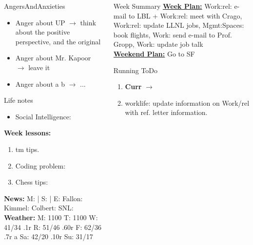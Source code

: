 \begin{columns}
\begin{column}{0.10\linewidth}
\begin{block}{AngersAndAnxieties}
\begin{itemize}
        \tiny \item \tiny Anger about UP $\rightarrow$ think about the positive
        perspective, and the original
      \item \tiny Anger about Mr. Kapoor $\rightarrow$  leave it
      \item \tiny Anger about a b  $\rightarrow$ ...
      \end{itemize}
    \end{block}
      \begin{block}{Life notes}
        \begin{itemize}
          \tiny \item \tiny Social Intelligence: 
        \end{itemize}
      \end{block}
      \begin{block}
        {\tiny {\bf Week lessons:}}
        \begin{enumerate}
        \item \tiny tm tips. 
        \item \tiny Coding problem:
        \item \tiny Chess tips: 
        \end{enumerate}
            {{\tiny {\tiny \bf  News:}} {\tiny  M:  | S: 
                | E: Fallon:  Kimmel:  Colbert: SNL:}}
            {{\tiny {\tiny \bf  Weather:}} {\tiny M: 1100 T: 1100 W: 41/34 .1r 
                 R: 51/46 .60r F: 62/36 .7r a Sa: 42/20 .10r Su: 31/17 }}
      \end{block}
  \end{column}
  \begin{column}{0.6\linewidth}
    \begin{block}{Week Summary}
      {\underline {\bf Week Plan:} 
        Work:rel: e-mail to LBL + Work:rel: meet with Crago, Work:rel: update LLNL jobs, Mgmt:Spaces: book flights, 
        Work: send e-mail to Prof. Gropp, Work: update job talk
      }\\

      {\underline{\bf Weekend Plan:} Go to SF } \\
  
    \end{block}
    \begin{block}{Running ToDo} %
      \begin{enumerate}  
      \item \tiny \textbf{Curr} $\rightarrow$  
      \item \tiny worklife: update information on Work/rel with ref. letter information.  
        

\end{enumerate}
\end{block}
\end{column}
\end{columns}
